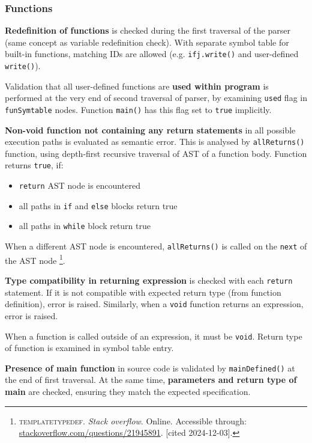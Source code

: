 \documentclass[a4paper, 11pt]{article}
\begin{document}
\subsubsection{Functions}
\textbf{Redefinition of functions} is checked during the first traversal of the parser (same concept as variable redefinition check).
With separate symbol table for built-in functions, matching IDs are allowed (e.g. \verb|ifj.write()| and user-defined \verb|write()|).
\par
Validation that all user-defined functions are \textbf{used within program} is performed at the very end of second traversal of parser,
by examining \verb|used| flag in \verb|funSymtable| nodes. Function \verb|main()| has this flag set to \verb|true| implicitly. 
\par
\textbf{Non-void function not containing any return statements} in all possible execution paths is evaluated as semantic error.
This is analysed by \verb|allReturns()| function, using depth-first recursive traversal of AST of a function body.
Function returns \verb|true|, if:
\begin{itemize}
    \item \verb|return| AST node is encountered
    \item all paths in \verb|if| and \verb|else| blocks return true
    \item all paths in \verb|while| block return true
\end{itemize}
When a different AST node is encountered, \verb|allReturns()| is called on the \verb|next| of the AST node
\footnote{\textsc{templatetypedef}. \textit{Stack overflow}. Online. Accessible through: \href{https://stackoverflow.com/questions/21945891/how-do-i-check-whether-all-code-paths-return-a-value}{stackoverflow.com/questions/21945891}. [cited 2024-12-03].}.
\par
\textbf{Type compatibility in returning expression} is checked with each \verb|return| statement. If it is not compatible with
expected return type (from function definition), error is raised. Similarly, when a \verb|void| function returns an expression,
error is raised.
\par
When a function is called outside of an expression, it must be \verb|void|. Return type of function is examined in 
symbol table entry.
\par
\textbf{Presence of main function} in source code is validated by \verb|mainDefined()| at the end of first traversal.
At the same time, \textbf{parameters and return type of main} are checked, ensuring they match the expected specification.
\end{document}
